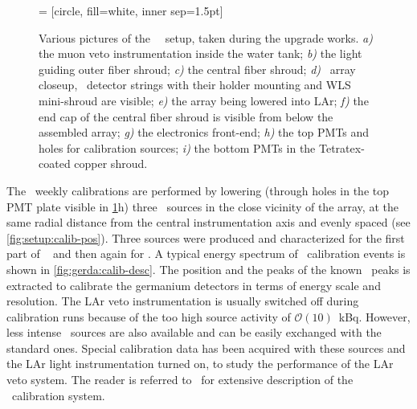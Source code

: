 \begin{figure}
   = [circle, fill=white, inner sep=1.5pt]
  \caption{%
    Various pictures of the \gerda\ \phasetwo\ setup, taken during the upgrade works.
    \emph{a)} the muon veto instrumentation inside the water tank; \emph{b)} the light
    guiding outer fiber shroud; \emph{c)} the central fiber shroud; \emph{d)} \phasetwo\
    array closeup, \bege\ detector strings with their holder mounting and WLS mini-shroud
    are visible; \emph{e)} the array being lowered into LAr; \emph{f)} the end cap of the
    central fiber shroud is visible from below the assembled array; \emph{g)} the
    electronics front-end; \emph{h)} the top PMTs and holes for calibration sources;
    \emph{i)} the bottom PMTs in the Tetratex\reg-coated copper shroud.
  }\label{fig:setup:pictures}
\end{figure}

The \gerda\ weekly calibrations are performed by lowering (through holes in the top PMT
plate visible in \cref{fig:setup:pictures}h) three \Th\ sources in the close vicinity of
the array, at the same radial distance from the central instrumentation axis and evenly
spaced (see \cref{fig:setup:calib-pos}). Three sources were produced and characterized for the
first part of \phasetwo~\cite{Baudis2015} and then again for \phasetwop. A typical energy
spectrum of \Th\ calibration events is shown in \cref{fig:gerda:calib-desc}. The position
and the peaks of the known \g\ peaks is extracted to calibrate the germanium detectors in
terms of energy scale and resolution. The LAr veto instrumentation is usually switched off
during calibration runs because of the too high source activity of $\mathcal{O}(10)$~kBq.
However, less intense \Ra\ sources are also available and can be easily exchanged with the
standard ones. Special calibration data has been acquired with these sources and the LAr
light instrumentation turned on, to study the performance of the LAr veto system. The
reader is referred to~\cite{Mingazheva2019, Miloradovic2020, Agostini2021c} for extensive
description of the \gerda\ calibration system.

